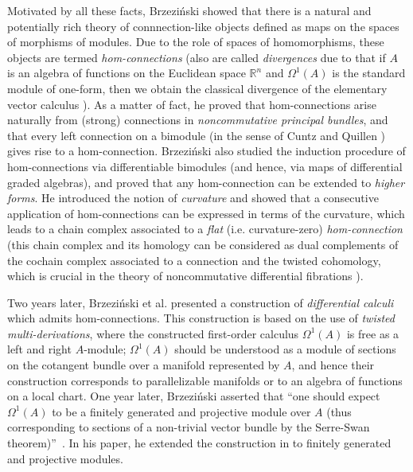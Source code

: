\documentclass{amsart}
\theoremstyle{definition}
\theoremstyle{remark}
\numberwithin{equation}{section}
\begin{document}
Motivated by all these facts, Brzezi{\'n}ski \cite{Brzezinski2008} showed that there is a natural and potentially rich theory of connnection-like objects defined as maps on the spaces of morphisms of modules. Due to the role of spaces of homomorphisms, these objects are termed {\em hom-connections} (also are called {\em divergences} due to that if $A$ is an algebra of functions on the Euclidean space $\mathbb{R}^n$ and $\Omega^{1}(A)$ is the standard module of one-form, then we obtain the classical divergence of the elementary vector calculus \cite[p. 892]{Brzezinski2011}). As a matter of fact, he proved that hom-connections arise naturally from (strong) connections in {\em noncommutative principal bundles}, and that every left connection on a bimodule (in the sense of Cuntz and Quillen \cite{CuntzQuillen1995}) gives rise to a hom-connection. %
Brzezi{\'n}ski also studied the induction procedure of hom-connections via differentiable bimodules (and hence, via maps of differential graded algebras), and proved that any hom-connection can be extended to {\em higher forms}. He introduced the notion of {\em curvature} and showed that a consecutive application of hom-connections can be expressed in terms of the curvature, which leads to a chain complex associated to a {\em flat} (i.e. curvature-zero) {\em hom-connection} (this chain complex and its homology can be considered as dual complements of the cochain complex associated to a connection and the twisted cohomology, which is crucial in the theory of noncommutative differential fibrations \cite{BeggsBrzezinski2005}).

Two years later, Brzezi{\'n}ski et al. \cite{BrzezinskiElKaoutitLomp2010} presented a construction of {\em differential calculi} which admits hom-connections. This construction is based on the use of {\em twisted multi-derivations}, where the constructed first-order calculus $\Omega^{1}(A)$ is free as a left and right $A$-module; $\Omega^{1}(A)$ should be understood as a module of sections on the cotangent bundle over a manifold represented by $A$, and hence their construction corresponds to parallelizable manifolds or to an algebra of functions on a local chart. One year later, Brzezi{\'n}ski asserted that \textquotedblleft one should expect $\Omega^1(A)$ to be a finitely generated and projective module over $A$ (thus corresponding to sections of a non-trivial vector bundle by the Serre-Swan theorem)\textquotedblright\ \cite[p. 885]{Brzezinski2011}. In his paper, he extended the construction in \cite{BrzezinskiElKaoutitLomp2010} to finitely generated and projective modules.
\end{document}

